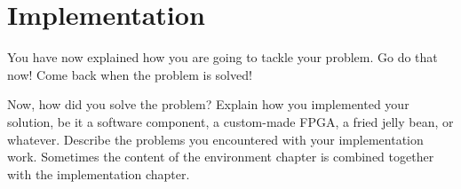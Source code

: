 \chapter{Implementation}
\label{chapter:implementation}

You have now explained how you are going to tackle your problem. 
Go do that now! Come back when the problem is solved!

Now, how did you solve the problem? 
Explain how you implemented your solution, be it a software component, a
custom-made FPGA, a fried jelly bean, or whatever.
Describe the problems you encountered with your implementation
work. Sometimes the content of the environment chapter is combined
together with the implementation chapter.
